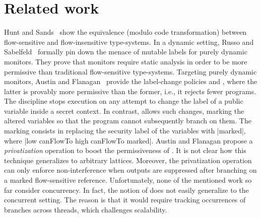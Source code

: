 \section{Related work}
\label{sec:related}

Hunt and Sands~\citep{Hunt:2006} show the equivalence (modulo code
transformation) between flow-sensitive and flow-insensitive type-systems. 
In a dynamic setting, Russo and Sabelfeld~\citep{Russo:2010} formally pin down
the menace of mutable labels for purely dynamic monitors. They prove that
monitors require static analysis in order to be more permissive than traditional
flow-sensitive type-systems. Targeting purely dynamic monitors, Austin and
Flanagan~\citep{Austin:Flanagan:PLAS09,Austin:Flanagan:PLAS10} provide the
label-change policies \emph{\nsu} and \emph{\pu}, where the latter is provably
more permissive than the former, i.e., it rejects fewer programs. The
{\nsu} discipline stops  execution on any attempt to change the label of a
public variable inside a secret context. In contrast, {\pu} allows such changes,
marking the altered variables so that the program cannot subsequently branch on
them. The marking consists in replacing the security label of the variables with
|marked|, where |low canFlowTo high canFlowTo marked|.  Austin and Flanagan
propose a \emph{privatization} operation to boost the permissiveness of {\pu}.
It is not clear how this technique generalizes to arbitrary lattices. Moreover,
the privatization operation can only enforce non-interference when outputs are
suppressed after branching on a marked flow-sensitive reference. Unfortunately,
none of the mentioned work so far consider concurrency. In fact, the notion of
{\pu} does not easily generalize to the concurrent setting. The reason is that
it would require tracking occurrences of branches across threads, which
challenges scalability.

